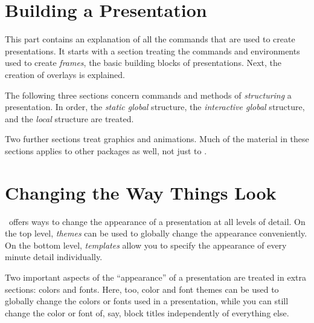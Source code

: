 \documentclass{ltxdoc}
\begin{document}









\part{Building a Presentation}

This part contains an explanation of all the commands that are used to create presentations. It starts with a section treating the commands and environments used to create \emph{frames}, the basic building blocks of presentations. Next, the creation of overlays is explained.

The following three sections concern commands and methods of \emph{structuring} a presentation. In order, the \emph{static global} structure, the \emph{interactive global} structure, and the \emph{local} structure are treated.

Two further sections treat graphics and animations. Much of the material in these sections applies to other packages as well, not just to \beamer.











\part{Changing the Way Things Look}

\beamer\ offers ways to change the appearance of a presentation at all levels of detail. On the top level, \emph{themes} can be used to globally change the appearance conveniently. On the bottom level, \emph{templates} allow you to specify the appearance of every minute detail individually.

Two important aspects of the ``appearance'' of a presentation are treated in extra sections: colors and fonts. Here, too, color and font themes can be used to globally change the colors or fonts used in a presentation, while you can still change the color or font of, say, block titles independently of everything else.





\end{document}
